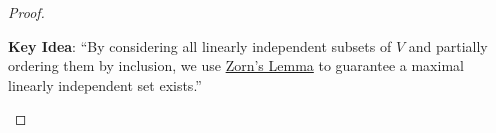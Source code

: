 \documentclass[11pt,openany]{article}
\renewcommand{\vec}[1]{\mathbf{#1}}
\begin{document}
\newpage
{}
\begin{proof}
	\ \begin{flushleft}\color{red}
		\textbf{Key Idea}: ``By considering all linearly independent subsets of \(V\) and partially ordering them by inclusion, we use \underline{Zorn's Lemma} to guarantee a maximal linearly independent set exists.''
	\end{flushleft}
%		
%		

\end{proof}
\end{document}

